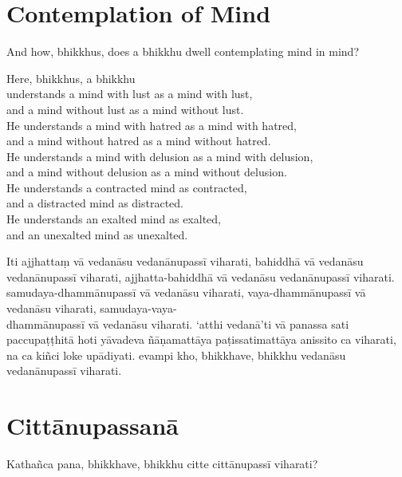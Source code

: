 
\chapter{Contemplation of Mind}

And how, bhikkhus, does a bhikkhu dwell contemplating mind in mind?

Here, bhikkhus, a bhikkhu\\
understands a mind with lust as a mind with lust,\\
and a mind without lust as a mind without lust.\\
He understands a mind with hatred as a mind with hatred,\\
and a mind without hatred as a mind without hatred.\\
He understands a mind with delusion as a mind with delusion,\\
and a mind without delusion as a mind without delusion.\\
He understands a contracted mind as contracted,\\
and a distracted mind as distracted.\\
He understands an exalted mind as exalted,\\
and an unexalted mind as unexalted.

\paliPage

Iti ajjhattaṃ vā vedanāsu vedanānupassī viharati, bahiddhā vā vedanāsu
vedanānupassī viharati, ajjhatta-bahiddhā vā vedanāsu vedanānupassī viharati.
samudaya-dhammānupassī vā vedanāsu viharati, vaya-dhammānupassī vā vedanāsu
viharati, samudaya-vaya-\\
dhammānupassī vā vedanāsu viharati. ‘atthi vedanā’ti vā panassa sati
paccupaṭṭhitā hoti yāvadeva ñāṇamattāya paṭissatimattāya anissito ca viharati,
na ca kiñci loke upādiyati. evampi kho, bhikkhave, bhikkhu vedanāsu
vedanānupassī viharati.


\chapter*{Cittānupassanā}

Kathañca pana, bhikkhave, bhikkhu citte cittānupassī viharati?

